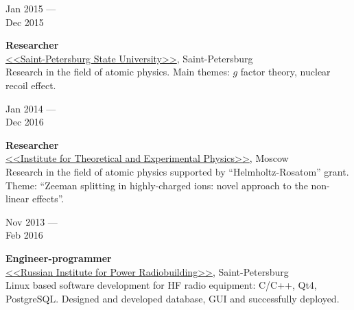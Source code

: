 \documentclass[10pt,a4paper]{article}
\newcommand{\lmpratio}{0.15}
\newcommand{\rmpratio}{0.74}
\newcommand{\vSpace}{0.5cm}
\newcommand{\horizontalSpace}{0.05\textwidth}
\newcommand{\sectionMain}[1]{\textbf{#1}}
\begin{document}
	\begin{minipage}[t]{\lmpratio\textwidth}
		Jan 2015 --- \\Dec 2015
	\end{minipage}
	\hspace{\horizontalSpace}
	\begin{minipage}[t]{\rmpratio\textwidth}
		\sectionMain{Researcher}\\
		\href{http://english.spbu.ru/}{<<Saint-Petersburg State University>>}, Saint-Petersburg\\[0.5cm]		
		Research in the field of atomic physics. 
		Main themes: $g$ factor theory, nuclear recoil effect. \\

	\end{minipage}
	\vspace{\vSpace}

	\begin{minipage}[t]{\lmpratio\textwidth}
		Jan 2014 --- \\Dec 2016
	\end{minipage}
	\hspace{\horizontalSpace}
	\begin{minipage}[t]{\rmpratio\textwidth}
		\sectionMain{Researcher}\\
		\href{http://frrc.itep.ru/index.php/en/}{<<Institute for Theoretical and Experimental Physics>>}, Moscow\\[0.5cm]
		Research in the field of atomic physics supported by ``Helmholtz-Rosatom'' grant. 
		Theme: ``Zeeman splitting in highly-charged ions: novel approach to the non-linear effects''. \\[0.5cm]
		
	\end{minipage}
	
	\vspace{\vSpace}

	\begin{minipage}[t]{\lmpratio\textwidth}
		Nov 2013 --- \\Feb 2016
	\end{minipage}
	\hspace{\horizontalSpace}
	\begin{minipage}[t]{\rmpratio\textwidth}
		\sectionMain{Engineer-programmer}\\
		\href{http://www.rimr.ru/eng/}{<<Russian Institute for Power Radiobuilding>>}, Saint-Petersburg\\[0.5cm]
		Linux based software development for HF radio equipment: C/C++, Qt4, PostgreSQL.
		Designed and developed database, GUI and successfully deployed.
	\end{minipage}
\end{document}
